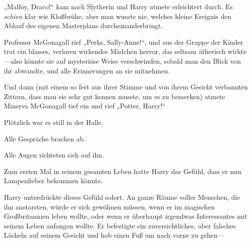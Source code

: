 „Malfoy, Draco!“ kam nach Slytherin und Harry atmete erleichtert durch. Es \emph{schien} klar wie Kloßbrühe, aber man wusste nie, welches kleine Ereignis den Ablauf des eigenen Masterplans durcheinanderbringt.

Professor McGonagall rief „Perks, Sally-Anne!“, und aus der Gruppe der Kinder trat ein blasses, verloren wirkendes Mädchen hervor, das seltsam ätherisch wirkte—also könnte sie auf mysteriöse Weise verschwinden, sobald man den Blick von ihr abwandte, und alle Erinnerungen an sie mitnehmen.

Und dann (mit einem so fest aus ihrer Stimme und von ihrem Gesicht verbannten Zittern, dass man sie sehr gut kennen musste, um es zu bemerken) atmete Minerva McGonagall tief ein und rief „Potter, Harry!“



Plötzlich war es still in der Halle.

Alle Gespräche brachen ab.

Alle Augen richteten sich auf ihn.

Zum ersten Mal in seinem gesamten Leben hatte Harry das Gefühl, dass er nun Lampenfieber bekommen könnte.


Harry unterdrückte dieses Gefühl sofort. An ganze Räume voller Menschen, die ihn anstarrten, würde er sich gewöhnen müssen, wenn er im magischen Großbritannien leben wollte, oder wenn er überhaupt irgendwas Interessantes mit seinem Leben anfangen wollte. Er befestigte ein zuversichtliches, aber falsches Lächeln auf seinem Gesicht und hob einen Fuß um nach vorne zu gehen—

